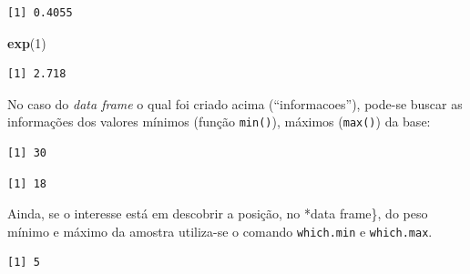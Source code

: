 \documentclass[12pt,brazil,oneside]{book}
\newenvironment{Shaded}{\begin{snugshade}}{\end{snugshade}}
\newcommand{\CommentTok}[1]{\textcolor[rgb]{0.56,0.35,0.01}{\textit{#1}}}
\newcommand{\DecValTok}[1]{\textcolor[rgb]{0.00,0.00,0.81}{#1}}
\newcommand{\KeywordTok}[1]{\textcolor[rgb]{0.13,0.29,0.53}{\textbf{#1}}}
\newcommand{\NormalTok}[1]{#1}
\newcommand{\OperatorTok}[1]{\textcolor[rgb]{0.81,0.36,0.00}{\textbf{#1}}}
\begin{document}
\begin{verbatim}
[1] 0.4055
\end{verbatim}

\begin{Shaded}
\begin{Highlighting}[]
\KeywordTok{exp}\NormalTok{(}\DecValTok{1}\NormalTok{)}
\end{Highlighting}
\end{Shaded}

\begin{verbatim}
[1] 2.718
\end{verbatim}

No caso do \emph{data frame} o qual foi criado acima (``informacoes''), pode-se buscar as informações dos valores mínimos (função \texttt{min()}), máximos (\texttt{max()}) da base:

\begin{Shaded}
\end{Shaded}

\begin{verbatim}
[1] 30
\end{verbatim}

\begin{Shaded}
\end{Shaded}

\begin{verbatim}
[1] 18
\end{verbatim}

Ainda, se o interesse está em descobrir a posição, no *data frame\}, do peso mínimo e máximo da amostra utiliza-se o comando \texttt{which.min} e \texttt{which.max}.

\begin{Shaded}
\end{Shaded}

\begin{verbatim}
[1] 5
\end{verbatim}
\end{document}
